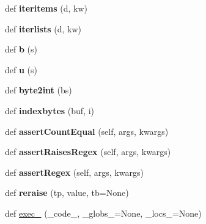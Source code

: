 \begin{DoxyCompactItemize}
def {\bfseries iteritems} (d, kw)
\item 
\mbox{\label{namespacepkg__resources_1_1__vendor_1_1six_aef6883dad188b8378ac318ac4e1e1b8f}} 
def {\bfseries iterlists} (d, kw)
\item 
\mbox{\label{namespacepkg__resources_1_1__vendor_1_1six_a8b7b45695513391ec7aa75e464f5ed73}} 
def {\bfseries b} (s)
\item 
\mbox{\label{namespacepkg__resources_1_1__vendor_1_1six_a019ae382db945434ae3177a68df156ff}} 
def {\bfseries u} (s)
\item 
\mbox{\label{namespacepkg__resources_1_1__vendor_1_1six_a6b293dfd3d1441d02a025599880458ab}} 
def {\bfseries byte2int} (bs)
\item 
\mbox{\label{namespacepkg__resources_1_1__vendor_1_1six_a86f292fd202e7f9888ccc8918d1ce1ee}} 
def {\bfseries indexbytes} (buf, i)
\item 
\mbox{\label{namespacepkg__resources_1_1__vendor_1_1six_adf15af9459c82f7c696e4a66fd6619e0}} 
def {\bfseries assert\+Count\+Equal} (self, args, kwargs)
\item 
\mbox{\label{namespacepkg__resources_1_1__vendor_1_1six_a454205dd77102352b190441396393310}} 
def {\bfseries assert\+Raises\+Regex} (self, args, kwargs)
\item 
\mbox{\label{namespacepkg__resources_1_1__vendor_1_1six_a13265b023ad238dd7f37f602f09b42b3}} 
def {\bfseries assert\+Regex} (self, args, kwargs)
\item 
\mbox{\label{namespacepkg__resources_1_1__vendor_1_1six_a2fd4430939dd31db66334b652e54fa28}} 
def {\bfseries reraise} (tp, value, tb=None)
\item 
def \hyperlink{namespacepkg__resources_1_1__vendor_1_1six_a2651d68d3e9c66b54cac7d1e83bd5af0}{exec\+\_\+} (\+\_\+code\+\_\+, \+\_\+globs\+\_\+=None, \+\_\+locs\+\_\+=None)

\end{DoxyCompactItemize}
